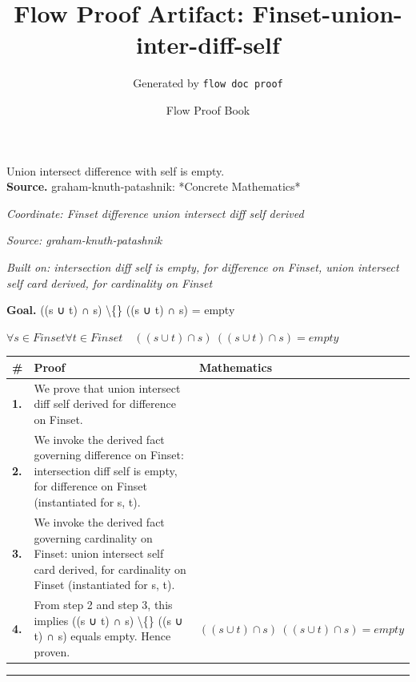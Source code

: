 \documentclass[11pt]{article}
\title{Flow Proof Artifact: Finset-union-inter-diff-self}
\author{Generated by \texttt{flow doc proof}}
\date{Flow Proof Book}
\theoremstyle{definition}
\begin{document}
\maketitle
Union intersect difference with self is empty.\\[0.5em]
\textbf{Source.} graham-knuth-patashnik: *Concrete Mathematics*\\[0.5em]
\bigskip
{}\par
\smallskip\noindent\textit{Coordinate: Finset \cdot difference \cdot union intersect diff self derived}\par
\smallskip\noindent\textit{Source: graham-knuth-patashnik}\par
\smallskip\noindent\textit{Built on: intersection diff self is empty, for difference on Finset, union intersect self card derived, for cardinality on Finset}\par
\medskip
\noindent\textbf{Goal.} ((s ∪ t) ∩ s) \textbackslash\{\} ((s ∪ t) ∩ s) = empty\par
\noindent$\displaystyle \forall s \in Finset \forall t \in Finset\quad ((s ∪ t) ∩ s) \ ((s ∪ t) ∩ s) = empty$\par
\medskip
\noindent
\begin{tabular}{@{} >{\raggedright\arraybackslash}p{} >{\raggedright\arraybackslash}p{} >{\raggedleft\arraybackslash}p{} @{}}
\textbf{\#} & \textbf{Proof} & \textbf{Mathematics} \\
\midrule
\textbf{1.} & We prove that union intersect diff self derived for difference on Finset. & \\[0.45em]
\textbf{2.} & We invoke the derived fact governing difference on Finset: intersection diff self is empty, for difference on Finset (instantiated for s, t). & \\[0.45em]
\textbf{3.} & We invoke the derived fact governing cardinality on Finset: union intersect self card derived, for cardinality on Finset (instantiated for s, t). & \\[0.45em]
\textbf{4.} & From step 2 and step 3, this implies ((s ∪ t) ∩ s) \textbackslash\{\} ((s ∪ t) ∩ s) equals empty. Hence proven. & $\displaystyle ((s ∪ t) ∩ s) \ ((s ∪ t) ∩ s) = empty$ \\[0.45em]
\bottomrule
\end{tabular}
\label{thm:Finset-difference-union_intersect_diff_self_derived}
\par\medskip\hrule
\end{document}
